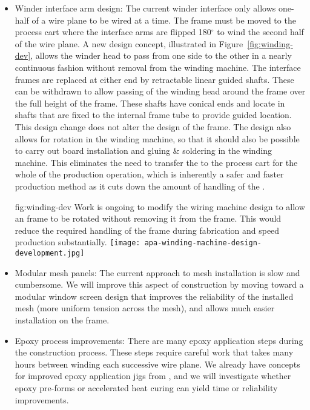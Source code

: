 \begin{itemize}
\item Winder interface arm design: The current winder interface only allows one-half of a wire plane to be wired at a time. The  frame must be moved to the process cart where the interface arms are flipped 180$^\circ$ to wind the second half of the wire plane.  A new design concept, illustrated in Figure~\ref{fig:winding-dev}, allows the winder head to pass from one side to the other in a nearly continuous fashion without removal from the winding machine.  The interface frames are replaced at either end by retractable linear guided shafts. These can be withdrawn to allow passing of the winding head around the frame over the full height of the frame. These shafts have conical ends and locate in shafts that are fixed to the internal frame tube to provide guided location. This design change does not alter the design of the frame. The design also allows for rotation in the winding machine, so that it should also be possible to carry out board installation and gluing \& soldering in the winding machine. This eliminates the need to transfer the  to the process cart for the whole of the production operation, which is inherently a safer and faster production method as it cuts down the amount of handling of the .

\begin{dunefigure}{fig:winding-dev}
{Work is ongoing to modify the wiring machine design to allow an  frame to be rotated without removing it from the frame.  This would reduce the required handling of the frame during fabrication and speed production substantially.}
\texttt{[image: apa-winding-machine-design-development.jpg]} 
\end{dunefigure}

\item Modular mesh panels: The current approach to mesh installation is slow and cumbersome. We will improve this aspect of construction by moving toward a modular window screen design that improves the reliability of the installed mesh (more uniform tension across the mesh), and allows much easier installation on the  frame.

\item Epoxy process improvements: There are many epoxy application steps during the construction process. These steps require careful work that takes many hours between winding each successive wire plane. We already have concepts for improved epoxy application jigs from , and we will investigate whether epoxy pre-forms or accelerated heat curing can yield time or reliability improvements.


\end{itemize}
